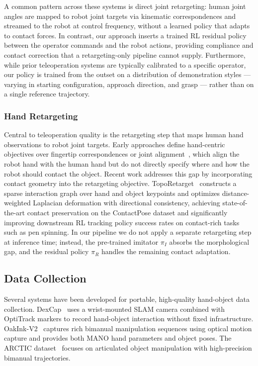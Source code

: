A common pattern across these systems is direct joint retargeting: human joint angles are
mapped to robot joint targets via kinematic correspondences and streamed to the robot at
control frequency, without a learned policy that adapts to contact forces.
In contrast, our approach inserts a trained RL residual policy between the operator commands
and the robot actions, providing compliance and contact correction that a retargeting-only
pipeline cannot supply.
Furthermore, while prior teleoperation systems are typically calibrated to a specific
operator, our policy is trained from the outset on a distribution of demonstration styles ---
varying in starting configuration, approach direction, and grasp --- rather than on a single
reference trajectory.
 
\subsubsection{Hand Retargeting}
\label{sec:related-retarget}
 
Central to teleoperation quality is the retargeting step that maps human hand observations
to robot joint targets.
Early approaches define hand-centric objectives over fingertip correspondences or joint
alignment~\cite{dexpilot, anyteleop}, which align the robot hand with the human hand but
do not directly specify where and how the robot should contact the object.
Recent work addresses this gap by incorporating contact geometry into the retargeting
objective.
TopoRetarget~\cite{toporetarget} constructs a sparse interaction graph over hand and object
keypoints and optimizes distance-weighted Laplacian deformation with directional consistency,
achieving state-of-the-art contact preservation on the ContactPose dataset and significantly
improving downstream RL tracking policy success rates on contact-rich tasks such as pen
spinning.
In our pipeline we do not apply a separate retargeting step at inference time; instead, the
pre-trained imitator $\pi_I$ absorbs the morphological gap, and the residual policy $\pi_R$
handles the remaining contact adaptation.
 

 
\subsection{Data Collection}
 
Several systems have been developed for portable, high-quality hand-object data
collection.
DexCap~\cite{dexcap} uses a wrist-mounted SLAM camera combined with OptiTrack markers to
record hand-object interaction without fixed infrastructure.
OakInk-V2~\cite{oakinkv2} captures rich bimanual manipulation sequences using optical
motion capture and provides both MANO hand parameters and object poses.
The ARCTIC dataset~\cite{arctic} focuses on articulated object manipulation with
high-precision bimanual trajectories.
 
